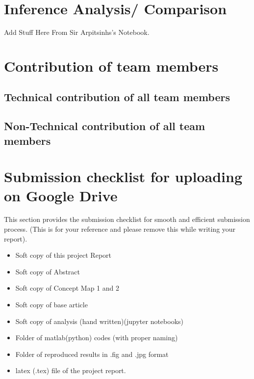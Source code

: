 \documentclass[11pt]{article}
\providecommand{\tightlist}{%
      \setlength{\itemsep}{0pt}\setlength{\parskip}{0pt}}
\begin{document}
\hypertarget{inference-analysis-comparison}{%
\section{Inference Analysis/
Comparison}\label{inference-analysis-comparison}}

Add Stuff Here From Sir Arpitsinhs's Notebook.

\hypertarget{contribution-of-team-members}{%
\section{Contribution of team
members}\label{contribution-of-team-members}}

\hypertarget{technical-contribution-of-all-team-members}{%
\subsection{Technical contribution of all team
members}\label{technical-contribution-of-all-team-members}}

\hypertarget{non-technical-contribution-of-all-team-members}{%
\subsection{Non-Technical contribution of all team
members}\label{non-technical-contribution-of-all-team-members}}

\hypertarget{submission-checklist-for-uploading-on-google-drive}{%
\section{Submission checklist for uploading on Google
Drive}\label{submission-checklist-for-uploading-on-google-drive}}

This section provides the submission checklist for smooth and efficient
submission process. (This is for your reference and please remove this
while writing your report).

\begin{itemize}
\tightlist
\item
  Soft copy of this project Report
\item
  Soft copy of Abstract
\item
  Soft copy of Concept Map 1 and 2
\item
  Soft copy of base article
\item
  Soft copy of analysis (hand written)(jupyter notebooks)
\item
  Folder of matlab(python) codes (with proper naming)
\item
  Folder of reproduced results in .fig and .jpg format
\item
  latex (.tex) file of the project report.
\end{itemize}
\end{document}
